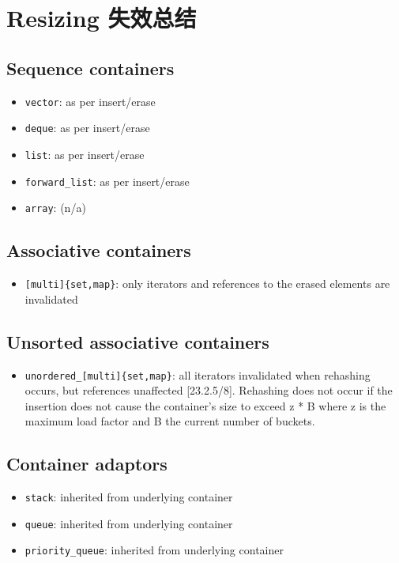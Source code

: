 \documentclass[UTF8,a4paper,12pt]{ctexbook}
\begin{document}
	\section{Resizing 失效总结}
		\subsection{Sequence containers}
			\begin{itemize}
				\item \verb|vector|: as per insert/erase 
				\item \verb|deque|: as per insert/erase 
				\item \verb|list|: as per insert/erase   
				\item \verb|forward_list|: as per insert/erase 
				\item \verb|array|: (n/a)
			\end{itemize}
		\subsection{Associative containers}
			\begin{itemize}
				\item \verb|[multi]{set,map}|:  only iterators and references to the erased elements are invalidated 
			\end{itemize}
		\subsection{Unsorted associative containers}
			\begin{itemize}
				\item \verb|unordered_[multi]{set,map}|: all iterators invalidated when rehashing occurs, but references unaffected [23.2.5/8]. Rehashing does not occur if the insertion does not cause the container's size to exceed z * B where z is the maximum load factor and B the current number of buckets.
			\end{itemize}
		
		\subsection{Container adaptors}
			\begin{itemize}
				\item \verb|stack|: inherited from underlying container
				\item \verb|queue|: inherited from underlying container
				\item \verb|priority_queue|: inherited from underlying container
			\end{itemize}
\end{document}
